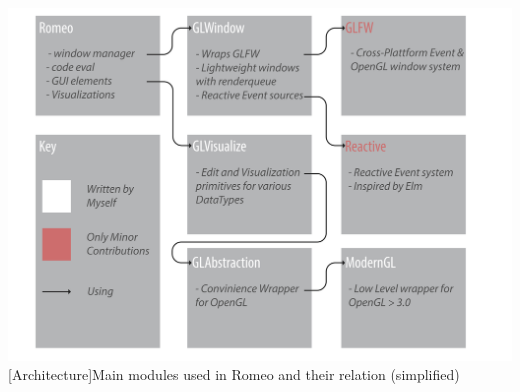 \vspace{1em}
\begin{minipage}{\linewidth}
    \centering
    \includegraphics[width=0.7\linewidth]{Bilder/architecture.pdf}
    [Architecture]{Main modules used in Romeo and their relation (simplified)}
    \label{fig:architecture} 
\end{minipage}
